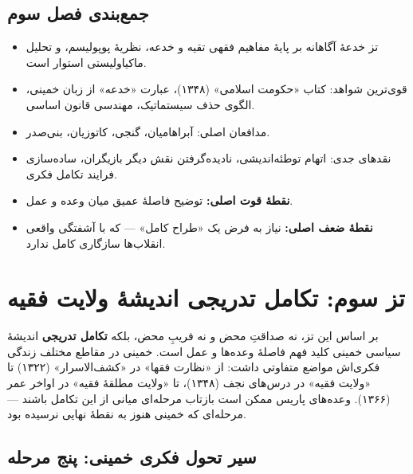 \documentclass[12pt,a4paper]{book}
\newcommand{\keyword}[1]{\textbf{\textcolor{cPrimary}{#1}}}
\begin{document}
\section{جمع‌بندی فصل سوم}

\begin{principleBox}
\begin{itemize}[label=\textcolor{cPrimary}{$\blacksquare$}, rightmargin=2em]
    \item تز خدعهٔ آگاهانه بر پایهٔ مفاهیم فقهی تقیه و خدعه، نظریهٔ پوپولیسم، و تحلیل ماکیاولیستی استوار است.
    \item قوی‌ترین شواهد: کتاب «حکومت اسلامی» (۱۳۴۸)، عبارت «خدعه» از زبان خمینی، الگوی حذف سیستماتیک، مهندسی قانون اساسی.
    \item مدافعان اصلی: آبراهامیان، گنجی، کاتوزیان، بنی‌صدر.
    \item نقدهای جدی: اتهام توطئه‌اندیشی، نادیده‌گرفتن نقش دیگر بازیگران، ساده‌سازی فرایند تکامل فکری.
    \item \keyword{نقطهٔ قوت اصلی:} توضیح فاصلهٔ عمیق میان وعده و عمل.
    \item \keyword{نقطهٔ ضعف اصلی:} نیاز به فرض یک «طراح کامل» — که با آشفتگی واقعی انقلاب‌ها سازگاری کامل ندارد.
\end{itemize}
\end{principleBox}


\chapter{تز سوم: تکامل تدریجی اندیشهٔ ولایت فقیه}

\begin{infoBox}
بر اساس این تز، نه صداقتِ محض و نه فریبِ محض، بلکه \keyword{تکامل تدریجی} اندیشهٔ سیاسی خمینی کلید فهم فاصلهٔ وعده‌ها و عمل است. خمینی در مقاطع مختلف زندگی فکری‌اش مواضع متفاوتی داشت: از «نظارت فقها» در «کشف‌الاسرار» (۱۳۲۲) تا «ولایت فقیه» در درس‌های نجف (۱۳۴۸)، تا «ولایت مطلقهٔ فقیه» در اواخر عمر (۱۳۶۶). وعده‌های پاریس ممکن است بازتاب مرحله‌ای میانی از این تکامل باشند — مرحله‌ای که خمینی هنوز به نقطهٔ نهایی نرسیده بود.
\end{infoBox}

\section{سیر تحول فکری خمینی: پنج مرحله}
\end{document}
